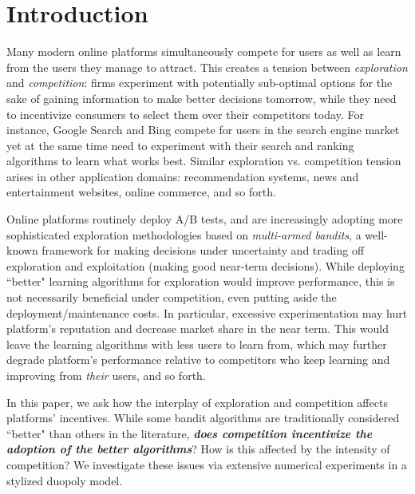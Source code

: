 \documentclass[../competing_bandits_with_appendix.tex]{subfiles}
\begin{document}
\section{Introduction}\label{sec:intro}

Many modern online platforms simultaneously compete for users as well as learn from the users they manage to attract. This creates a tension between \textit{exploration} and \textit{competition}: firms experiment with potentially sub-optimal options for the sake of gaining information to make better decisions tomorrow, while they need to incentivize consumers to select them over their competitors today. For instance, Google Search and Bing compete for users in the search engine market yet at the same time need to experiment with their search and ranking algorithms to learn what works best. Similar exploration vs. competition tension arises in other application domains: recommendation systems, news and entertainment websites, online commerce, and so forth.


Online platforms routinely deploy A/B tests, and are increasingly adopting  more sophisticated exploration methodologies based on \emph{multi-armed bandits}, a well-known framework for making decisions under uncertainty and trading off exploration and exploitation (making good near-term decisions). While deploying ``better" learning algorithms for exploration would improve performance, this is not necessarily beneficial under competition, even putting aside the deployment/maintenance costs. In particular, excessive experimentation may hurt platform's reputation and decrease market share in the near term. This would leave the learning algorithms with less users to learn from, which may further degrade platform's performance relative to competitors who keep learning and improving from \emph{their} users, and so forth.

In this paper, we ask how the interplay of exploration and competition affects platforms' incentives. While some bandit algorithms are traditionally considered ``better" than others in the literature, {\bf\em does competition incentivize the adoption of the better algorithms}? How is this affected by the intensity of competition? We investigate these issues via extensive numerical experiments in a stylized duopoly model.
\end{document}
